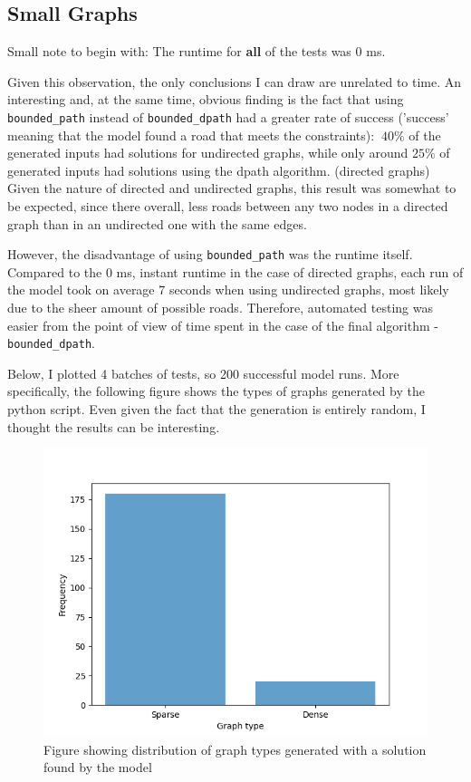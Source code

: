 \documentclass{article}
\begin{document}
\subsection{Small Graphs}
Small note to begin with: The runtime for \textbf{all} of the tests was 0 ms. 

Given this observation, the only conclusions I can
draw are unrelated to time. An interesting and, at the same time, obvious finding is the fact that using \texttt{bounded\_path} 
instead of \texttt{bounded\_dpath} had a greater rate of success ('success' meaning that the model found a road that meets the constraints): 
$~40\%$ of the generated inputs had solutions for undirected graphs, while only around $25\%$ of generated inputs had solutions using the 
dpath algorithm. (directed graphs) Given the nature of directed and undirected graphs, this result was somewhat to be expected, since there 
overall, less roads between any two nodes in a directed graph than in an undirected one with the same edges. 

However, the disadvantage of using \texttt{bounded\_path} was the runtime itself. Compared to the 0 ms, instant runtime in the case of directed 
graphs, each run of the model took on average 7 seconds when using undirected graphs, most likely due to the sheer amount of possible roads. 
Therefore, automated testing was easier from the point of view of time spent in the case of the final algorithm - \texttt{bounded\_dpath}.

Below, I plotted 4 batches of tests, so 200 successful model runs. More specifically, the following figure shows the types of 
graphs generated by the python script. Even given the fact that the generation is entirely random, I thought the results can be interesting.

\begin{figure}[h]
    \centering 
    \includegraphics[width=0.8\linewidth]{../images/figure1.png}
    \caption{Figure showing distribution of graph types generated with a solution found by the model}
\end{figure}
\end{document}
